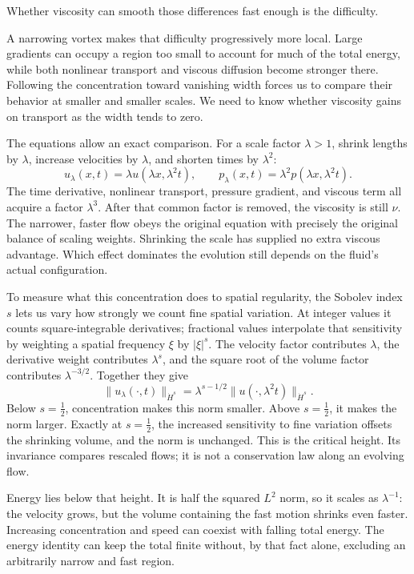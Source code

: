 Whether viscosity can smooth those differences fast enough is the difficulty.

A narrowing vortex makes that difficulty progressively more local. Large
gradients can occupy a region too small to account for much of the total
energy, while both nonlinear transport and viscous diffusion become stronger
there. Following the concentration toward vanishing width forces us to
compare their behavior at smaller and smaller scales. We need to know whether viscosity gains on transport as the width tends
to zero.

The equations allow an exact comparison. For a scale factor \(\lambda>1\),
shrink lengths by \(\lambda\), increase velocities by \(\lambda\), and
shorten times by \(\lambda^2\):
\[
 u_\lambda(x,t)=\lambda u(\lambda x,\lambda^2t),
 \qquad
 p_\lambda(x,t)=\lambda^2p(\lambda x,\lambda^2t).
\]
The time derivative, nonlinear transport, pressure gradient, and viscous
term all acquire a factor \(\lambda^3\). After that common factor is
removed, the viscosity is still \(\nu\). The narrower, faster flow obeys
the original equation with precisely the original balance of scaling
weights. Shrinking the scale has supplied no extra viscous advantage.
Which effect dominates the evolution still depends on the fluid's actual
configuration.

To measure what this concentration does to spatial regularity, the Sobolev
index \(s\) lets us vary how strongly we count fine spatial variation.
At integer values it counts square-integrable derivatives; fractional values
interpolate that sensitivity by weighting a spatial frequency \(\xi\) by
\(\lvert\xi\rvert^s\). The velocity factor contributes \(\lambda\), the
derivative weight contributes \(\lambda^s\), and the square root of the
volume factor contributes \(\lambda^{-3/2}\). Together they give
\[
 \|u_\lambda(\cdot,t)\|_{\dot H^s}
 =\lambda^{s-1/2}\|u(\cdot,\lambda^2t)\|_{\dot H^s}.
\]
Below \(s=\tfrac12\), concentration makes this norm smaller. Above
\(s=\tfrac12\), it makes the norm larger. Exactly at \(s=\tfrac12\),
the increased sensitivity to fine variation offsets the shrinking volume,
and the norm is unchanged. This is the critical height. Its invariance
compares rescaled flows; it is not a conservation law along an evolving flow.

Energy lies below that height. It is half the squared \(L^2\) norm, so it
scales as \(\lambda^{-1}\): the velocity grows, but the volume containing the fast
motion shrinks even faster. Increasing concentration and speed can coexist
with falling total energy. The energy identity can keep the total finite
without, by that fact alone, excluding an arbitrarily narrow and fast region.

